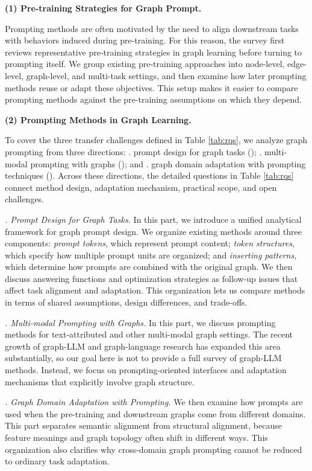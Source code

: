 \textbf{(1) Pre-training Strategies for Graph Prompt.}

Prompting methods are often motivated by the need to align downstream tasks with behaviors induced during pre-training. For this reason, the survey first reviews representative pre-training strategies in graph learning before turning to prompting itself. We group existing pre-training approaches into node-level, edge-level, graph-level, and multi-task settings, and then examine how later prompting methods reuse or adapt these objectives. This setup makes it easier to compare prompting methods against the pre-training assumptions on which they depend.



\textbf{(2) Prompting Methods in Graph Learning.}

To cover the three transfer challenges defined in Table \ref{tab:rqs}, we analyze graph prompting from three directions: . prompt design for graph tasks (); . multi-modal prompting with graphs (); and . graph domain adaptation with prompting techniques (). Across these directions, the detailed questions in Table \ref{tab:rqs} connect method design, adaptation mechanism, practical scope, and open challenges.

\textit{. Prompt Design for Graph Tasks.} In this part, we introduce a unified analytical framework for graph prompt design. We organize existing methods around three components: \textit{prompt tokens}, which represent prompt content; \textit{token structures}, which specify how multiple prompt units are organized; and \textit{inserting patterns}, which determine how prompts are combined with the original graph. We then discuss answering functions and optimization strategies as follow-up issues that affect task alignment and adaptation. This organization lets us compare methods in terms of shared assumptions, design differences, and trade-offs.


\textit{. Multi-modal Prompting with Graphs.} In this part, we discuss prompting methods for text-attributed and other multi-modal graph settings. The recent growth of graph-LLM and graph-language research has expanded this area substantially, so our goal here is not to provide a full survey of graph-LLM methods. Instead, we focus on prompting-oriented interfaces and adaptation mechanisms that explicitly involve graph structure.

\textit{. Graph Domain Adaptation with Prompting.} We then examine how prompts are used when the pre-training and downstream graphs come from different domains. This part separates semantic alignment from structural alignment, because feature meanings and graph topology often shift in different ways. This organization also clarifies why cross-domain graph prompting cannot be reduced to ordinary task adaptation.




